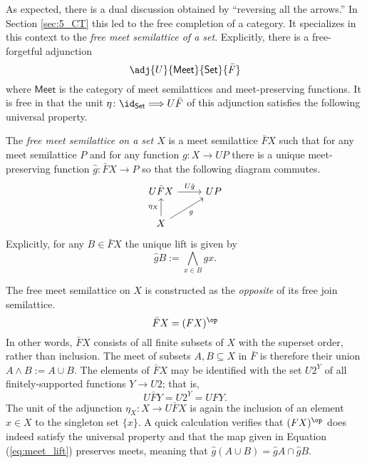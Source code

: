 As expected, there is a dual discussion obtained by ``reversing all the arrows.'' In Section \ref{sec:5_CT} this led to the free completion of a category. It specializes in this context to the \textit{free meet semilattice of a set}.  Explicitly, there is a free-forgetful adjunction
\[\adj{U}{\mathsf{Meet}}{\mathsf{Set}}{\bar F}\]
where $\mathsf{Meet}$ is the category of meet semilattices and meet-preserving functions. It is free in that the unit $\eta\colon \id_{\mathsf{Set}}\Longrightarrow U\bar F$ of this adjunction satisfies the following universal property.
\begin{UP_meet}
The \textit{free meet semilattice on a set $X$} is a meet semilattice $\bar FX$ such that for any meet semilattice $P$ and for any function $g\colon X\to UP$ there is a unique meet-preserving function $\hat g\colon \bar FX\to P$ so that the following diagram commutes.
\[
  \begin{tikzcd}
  U\bar FX \arrow[r, "U\hat g"]                    & UP \\
  X \arrow[ru, "g"'] \arrow[u, "\eta_X"] &   
  \end{tikzcd}
\]
Explicitly, for any $B\in \bar FX$ the unique lift is given by
\begin{equation}\label{eq:meet_lift}
\hat gB:=\bigwedge_{x\in B}gx.
\end{equation}
\end{UP_meet}
\noindent The free meet semilattice on $X$ is constructed as the \textit{opposite} of its free join semilattice.
\begin{equation}\label{eq:join_op}
\bar F X=(FX)^{\op}
\end{equation}
In other words, $\bar FX$ consists of all 
finite subsets of $X$ with the superset order, rather than inclusion. The meet of subsets $A,B\subseteq X$ in $\bar F$ is therefore their union $A\wedge B:=A\cup B.$ The elements of $\bar FX$ may be identified with the set $U2^Y$ of all finitely-supported functions $Y\to U2$; that is,
\[U\bar FY=U2^Y= UFY.\] 
The unit of the adjunction $\eta_X\colon X\to U\bar FX$ is again the inclusion of an element $x\in X$ to the singleton set $\{x\}$. A quick calculation verifies that $(FX)^{\op}$ does indeed satisfy the universal property and that the map given in Equation (\ref{eq:meet_lift}) preserves meets,  meaning that $\hat g(A\cup B)=\hat gA\cap \hat gB$.
